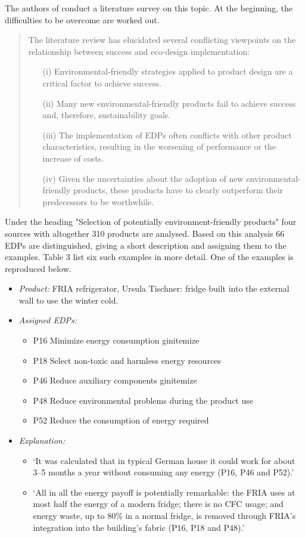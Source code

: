 \documentclass[11pt,a4paper]{article}
\begin{document}
The authors of \cite{Maccioni2019} conduct a literature survey on this topic.
At the beginning, the difficulties to be overcome are worked out.
\begin{quote}
  The literature review has elucidated several conflicting viewpoints on the
  relationship between success and eco-design implementation:
\begin{itemize}
\item[(i)] Environmental-friendly strategies applied to product design are a
  critical factor to achieve success.
\item[(ii)] Many new environmental-friendly products fail to achieve success
  and, therefore, sustainability goals.
\item[(iii)] The implementation of EDPs often conflicts with other product
  characteristics, resulting in the worsening of performance or the increase
  of costs.
\item[(iv)] Given the uncertainties about the adoption of new
  environmental-friendly products, these products have to clearly outperform
  their predecessors to be worthwhile.
\end{itemize}
\end{quote}
Under the heading "Selection of potentially environment-friendly products"
four sources with altogether 310 products are analysed.  Based on this
analysis 66 EDPs are distinguished, giving a short description and assigning
them to the examples.  Table 3 list six such examples in more detail.  One of
the examples is reproduced below.
\begin{itemize}
\item \emph{Product:} FRIA refrigerator, Ursula Tischner: fridge built into
  the external wall to use the winter cold.
\item \emph{Assigned EDPs:}
  \begin{itemize}
  \item P16 Minimize energy consumption gin{itemize}
  \item P18 Select non-toxic and harmless energy resources 
  \item P46 Reduce auxiliary components gin{itemize}
  \item P48 Reduce environmental problems during the product use
  \item P52 Reduce the consumption of energy required
  \end{itemize}
\item \emph{Explanation:} 
  \begin{itemize}
  \item ‘It was calculated that in typical German house it could work for
    about 3–5 months a year without consuming any energy (P16, P46 and P52).’
  \item ‘All in all the energy payoff is potentially remarkable: the FRIA uses
    at most half the energy of a modern fridge; there is no CFC usage; and
    energy waste, up to 80\% in a normal fridge, is removed through FRIA’s
    integration into the building’s fabric (P16, P18 and P48).’
  \end{itemize}
\end{itemize}
\end{document}

